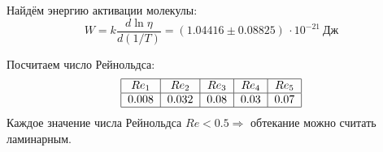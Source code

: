 \documentclass[20pt]{article}
\begin{document}
Найдём энергию активации молекулы: 
\[
W = k \frac{d\ln\eta}{d(1/T)} = (1.04416 \pm 0.08825)\,\cdot 10^{-21}\ \text{Дж}
\]

Посчитаем число Рейнольдса:
\[
\begin{tabular}{|c|c|c|c|c|}
\hline   $Re_1$ & $Re_2$ & $Re_3$ & $Re_4$ & $Re_5$ \\
\hline   $0.008$ & $0.032$ & $0.08$ & $0.03$ & $0.07$ \\
\hline
\end{tabular}
\]
Каждое значение числа Рейнольдса $Re < 0.5 \Rightarrow$ обтекание можно считать ламинарным.\\
\end{document}
